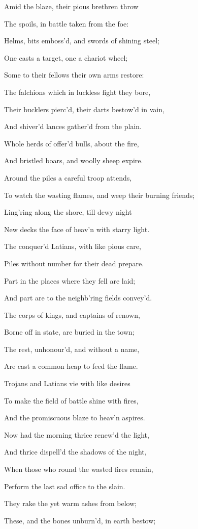Amid the blaze, their pious brethren throw

The spoils, in battle taken from the foe:

Helms, bits emboss’d, and swords of shining steel;

One casts a target, one a chariot wheel;

Some to their fellows their own arms restore:

The falchions which in luckless fight they bore,

Their bucklers pierc’d, their darts bestow’d in vain,

And shiver’d lances gather’d from the plain.

Whole herds of offer’d bulls, about the fire,

And bristled boars, and woolly sheep expire.

Around the piles a careful troop attends,

To watch the wasting flames, and weep their burning friends;

Ling’ring along the shore, till dewy night

New decks the face of heav’n with starry light.

The conquer’d Latians, with like pious care,

Piles without number for their dead prepare.

Part in the places where they fell are laid;

And part are to the neighb’ring fields convey’d.

The corps of kings, and captains of renown,

Borne off in state, are buried in the town;

The rest, unhonour’d, and without a name,

Are cast a common heap to feed the flame.

Trojans and Latians vie with like desires

To make the field of battle shine with fires,

And the promiscuous blaze to heav’n aspires.

Now had the morning thrice renew’d the light,

And thrice dispell’d the shadows of the night,

When those who round the wasted fires remain,

Perform the last sad office to the slain.

They rake the yet warm ashes from below;

These, and the bones unburn’d, in earth bestow;

